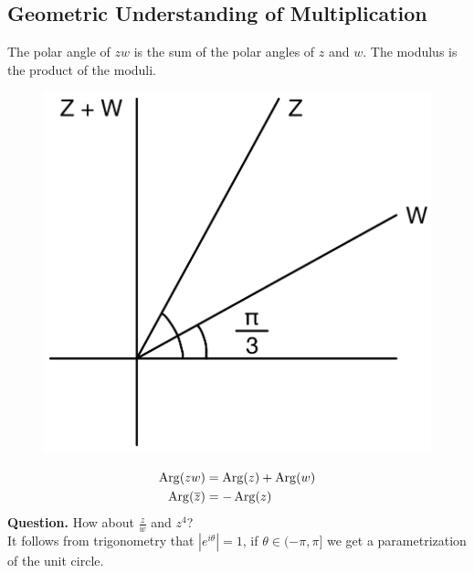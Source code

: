 \documentclass[11pt]{article}
\begin{document}
\subsection{Geometric Understanding of Multiplication}
The polar angle of $zw$ is the sum of the polar angles of $z$ and $w$. The modulus is the product of the moduli. 
\begin{figure}[H]
\includegraphics[scale = 0.165]{2_3}
\centering
\end{figure}
\vspace{-1cm}
\begin{align*}
\operatorname{Arg}(zw) &= \operatorname{Arg}(z) + \operatorname{Arg}(w) \\
\operatorname{Arg}(\overline{z}) &= -\operatorname{Arg}(z)
\end{align*}
\textbf{Question.} How about $\frac{z}{w}$ and $z^4$? \\
It follows from trigonometry that $|e^{i\theta}| = 1$, if $\theta \in (-\pi, \pi]$ we get a parametrization of the unit circle. 
\end{document}
